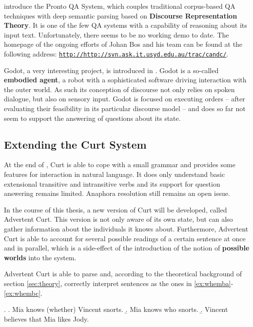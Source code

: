 \documentclass[11pt,a4paper]{article}
\newcommand{\abbr}{\textsf} %
\newcommand{\term}[1]{\textsf{\textbf{#1}}} %
\newcommand{\code}{\texttt} %
\newcommand{\pn}{\textsf} %
\newcommand{\url}[1]{\code{http://#1}} %
\newcommand{\curt}{\pn{Curt}}
\newcommand{\acurt}{\pn{Advertent Curt}}
\theoremstyle{remark}
\theoremstyle{remark}
\theoremstyle{definition}
\begin{document}
\cite{prontoqa} introduce the \pn{Pronto QA System}, which couples traditional
corpus-based \abbr{QA} techniques with deep semantic parsing based on
\term{Discourse Representation Theory}. It is one of the few \abbr{QA} systems
with a capability of reasoning about its input text. Unfortunately, there seems
to be no working demo to date. The homepage of the ongoing efforts of Johan Bos
and his team can be found at the following address:
\href{http://svn.ask.it.usyd.edu.au/trac/candc/}{\url{http://svn.ask.it.usyd.edu.au/trac/candc/}}.

\pn{Godot}, a very interesting project, is introduced in \cite{godot}.
\pn{Godot} is a so-called \term{embodied agent}, a robot with a sophisticated
software driving interaction with the outer world. As such its conception of
discourse not only relies on spoken dialogue, but also on sensory input.
\pn{Godot} is focused on executing orders -- after evaluating their feasibility
in its particular discourse model -- and does so far not seem to support the answering
of questions about its state.

\subsection{Extending the Curt System}\label{sec:extension}

At the end of \cite{blackburnbos:cl1}, \curt{} is able to cope with a small
grammar and provides some features for interaction in natural
language. It does only understand basic extensional transitive and intransitive
verbs and its support for question answering remains limited.
Anaphora resolution still remains an open issue.

In the course of this thesis, a new version of \curt{} will be developed, called
\acurt. This version is not only aware of its own state, but can also gather
information about the individuals it knows about. Furthermore, \acurt{} is able
to account for several possible readings of a certain sentence at once and in
parallel, which is a side-effect of the introduction of the notion of
\term{possible worlds} into the system.

\acurt{} is able to parse and, according to the theoretical background of section
\ref{sec:theory}, correctly interpret sentences as the ones in
\ref{ex:whemba}-\ref{ex:whembc}.

\ex.
\a.  Mia knows (whether) Vincent snorts.\label{ex:whemba}
\b.  Mia knows who snorts.
\b.  Vincent believes that Mia likes Jody.\label{ex:whembc}
\end{document}
